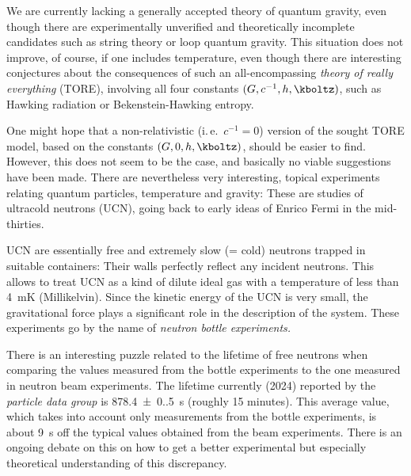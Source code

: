 
\newpage {}
\label{sec:1011}

We are currently lacking a generally accepted theory of quantum gravity, even though there are experimentally unverified and theoretically incomplete candidates such as string theory or loop quantum gravity. This situation does not improve,  of course, if one includes temperature, even though there are interesting conjectures about the consequences of such an all-encompassing \emph{theory of really everything} (TORE), involving all four constants $(G,c^{-1},h,\kboltz)$, such as Hawking radiation or Bekenstein-Hawking entropy.

One might hope that a non-relativistic (i.\,e.\ $c^{-1}=0$) version of the sought TORE model, based on the constants $(G,0,h,\kboltz)$, should be easier to find. However, this does not seem to be the case, and basically no viable suggestions have been made. There are nevertheless very interesting, topical experiments relating quantum particles, temperature and gravity: These are studies of ultracold neutrons (UCN), going back to early ideas of Enrico Fermi in the mid-thirties.

UCN are essentially free and extremely slow (= cold) neutrons trapped in suitable containers: Their walls perfectly reflect any incident neutrons. This allows to treat UCN as a kind of dilute ideal gas with a temperature of less than \qty{4}{\milli\kelvin} (Millikelvin). Since the kinetic energy of the UCN is very small, the gravitational force plays a significant role in the description of the system. These experiments go by the name of \emph{neutron bottle experiments.}

There is an interesting puzzle related to the lifetime of free neutrons when comparing the values measured from the bottle experiments to the one measured in neutron beam experiments. The lifetime currently (2024) reported by the \emph{particle data group} is \qty{878.4(0.5)}{\second} (roughly 15 minutes). This average value, which takes into account only measurements from the bottle experiments, is about \qty{9}{\second} off the typical values obtained from the beam experiments. There is an ongoing debate on this on how to get a better experimental but especially theoretical understanding of this discrepancy.
